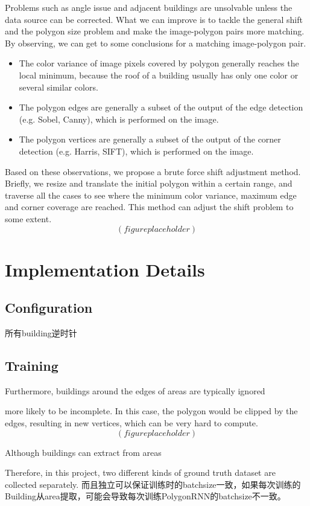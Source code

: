 Problems such as angle issue and adjacent buildings are unsolvable unless the data source can be corrected. What we can improve is to tackle the general shift and the polygon size problem and make the image-polygon pairs more matching. By observing, we can get to some conclusions for a matching image-polygon pair.
\begin{itemize}
\item The color variance of image pixels covered by polygon generally reaches the local minimum, because the roof of a building usually has only one color or several similar colors.
\item The polygon edges are generally a subset of the output of the edge detection (e.g. Sobel, Canny), which is performed on the image.
\item The polygon vertices are generally a subset of the output of the corner detection (e.g. Harris, SIFT), which is performed on the image.
\end{itemize}
Based on these observations, we propose a brute force shift adjustment method. Briefly, we resize and translate the initial polygon within a certain range, and traverse all the cases to see where the minimum color variance, maximum edge and corner coverage are reached. This method can adjust the shift problem to some extent.
$$(figure placeholder)$$

\section{Implementation Details}\label{impdet}


\subsection{Configuration}\label{config}

所有building逆时针

\subsection{Training}

Furthermore, buildings around the edges of areas are typically ignored 

more likely to be incomplete. In this case, the polygon would be clipped by the edges, resulting in new vertices, which can be very hard to compute.
$$(figure placeholder)$$

Although buildings can extract from areas

Therefore, in this project, two different kinds of ground truth dataset are collected separately.
而且独立可以保证训练时的batchsize一致，如果每次训练的Building从area提取，可能会导致每次训练PolygonRNN的batchsize不一致。

